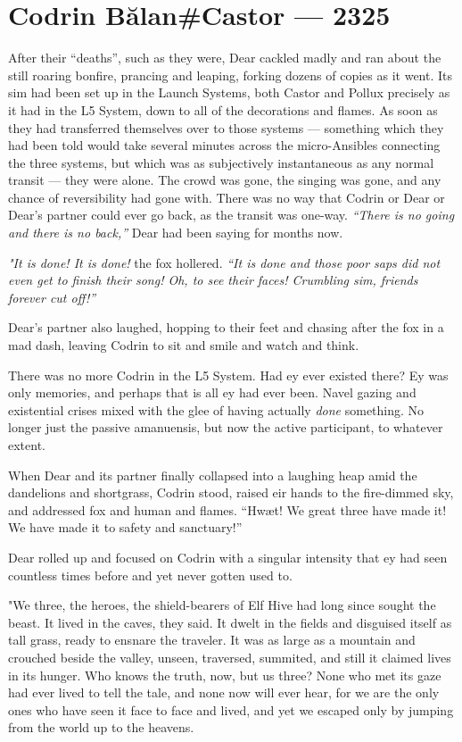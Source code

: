 \hypertarget{codrin-bux103lancastor-2325}{%
\chapter{Codrin Bălan\#Castor — 2325}\label{codrin-bux103lancastor-2325}}

After their ``deaths'', such as they were, Dear cackled madly and ran about the still roaring bonfire, prancing and leaping, forking dozens of copies as it went. Its sim had been set up in the Launch Systems, both Castor and Pollux precisely as it had in the L5 System, down to all of the decorations and flames. As soon as they had transferred themselves over to those systems — something which they had been told would take several minutes across the micro-Ansibles connecting the three systems, but which was as subjectively instantaneous as any normal transit — they were alone. The crowd was gone, the singing was gone, and any chance of reversibility had gone with. There was no way that Codrin or Dear or Dear's partner could ever go back, as the transit was one-way. \emph{``There is no going and there is no back,''} Dear had been saying for months now.

\emph{"It is done! It is done!} the fox hollered. \emph{``It is done and those poor saps did not even get to finish their song! Oh, to see their faces! Crumbling sim, friends forever cut off!''}

Dear's partner also laughed, hopping to their feet and chasing after the fox in a mad dash, leaving Codrin to sit and smile and watch and think.

There was no more Codrin in the L5 System. Had ey ever existed there? Ey was only memories, and perhaps that is all ey had ever been. Navel gazing and existential crises mixed with the glee of having actually \emph{done} something. No longer just the passive amanuensis, but now the active participant, to whatever extent.

When Dear and its partner finally collapsed into a laughing heap amid the dandelions and shortgrass, Codrin stood, raised eir hands to the fire-dimmed sky, and addressed fox and human and flames. ``Hwæt! We great three have made it! We have made it to safety and sanctuary!''

Dear rolled up and focused on Codrin with a singular intensity that ey had seen countless times before and yet never gotten used to.

"We three, the heroes, the shield-bearers of Elf Hive had long since sought the beast. It lived in the caves, they said. It dwelt in the fields and disguised itself as tall grass, ready to ensnare the traveler. It was as large as a mountain and crouched beside the valley, unseen, traversed, summited, and still it claimed lives in its hunger. Who knows the truth, now, but us three? None who met its gaze had ever lived to tell the tale, and none now will ever hear, for we are the only ones who have seen it face to face and lived, and yet we escaped only by jumping from the world up to the heavens.

